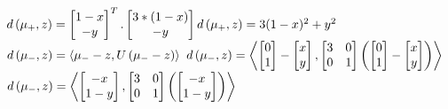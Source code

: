 \documentclass[a4paper,11pt]{article}
\begin{document}
\begin{mlsolution}
\begin{math}
d\left ( \mu_{+}, \space z \right ) = \begin{bmatrix} 1-x\\ -y \end{bmatrix} ^{T}.\begin{bmatrix} 3*(1-x) \\ -y \end{bmatrix}\\ \\
d\left ( \mu_{+}, \space z \right ) = 3(1-x)^{2} + y^{2}
\end{math}
\newline
\begin{math}
\\
d\left ( \mu_{-}, \space z \right ) = \left \langle \mu_{-} - z, \space U\left ( \mu_{-} - z \right ) \right \rangle
\end{math}
\newline
\newline
\begin{math}
d\left ( \mu_{-}, \space z \right ) = \left \langle \begin{bmatrix} 0\\ 1 \end{bmatrix} - \begin{bmatrix} x\\ y \end{bmatrix} , \begin{bmatrix} 
3 & 0 \\ 0 & 1 \end{bmatrix} \left (  \begin{bmatrix} 0\\ 1 \end{bmatrix} - \begin{bmatrix} x\\ y \end{bmatrix}  \right ) \right \rangle
\end{math}
\newline
\begin{math}
d\left ( \mu_{-}, \space z \right ) = \left \langle \begin{bmatrix} -x\\ 1-y \end{bmatrix} , \begin{bmatrix} 
3 & 0 \\ 0 & 1 \end{bmatrix} \left (  \begin{bmatrix} -x\\1 -y \end{bmatrix}  \right ) \right \rangle

\end{math}
\end{mlsolution}
\end{document}

